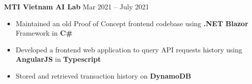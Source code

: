\documentclass[11pt]{article}
\begin{document}
\hspace{10pt}\textbf{MTI Vietnam AI Lab} \hfill {\small Mar 2021 -- July 2021} \\
  \vspace{-2pt}
  \begin{itemize}[leftmargin=31pt]
  \vspace{-10pt}
    \setlength\itemsep{-5pt}
      \item {\small Maintained an old Proof of Concept frontend codebase using \textbf{.NET Blazor} Framework in \textbf{C\#}}
      \item {\small Developed a frontend web application to query API requests history using \textbf{AngularJS} in \textbf{Typescript}}
      \item {\small Stored and retrieved transaction history on \textbf{DynamoDB}}
    \vspace{-7pt}
  \end{itemize}

  
\end{document}
